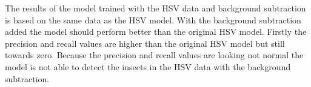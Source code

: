 The results of the model trained with the HSV data and background subtraction is based on the same data as the HSV model. With the background subtraction added the model should perform better than the original HSV model. Firstly the precision and recall values are higher than the original HSV model but still towards zero. Because the precision and recall values are looking not normal the model is not able to detect the insects in the HSV data with the background subtraction.
